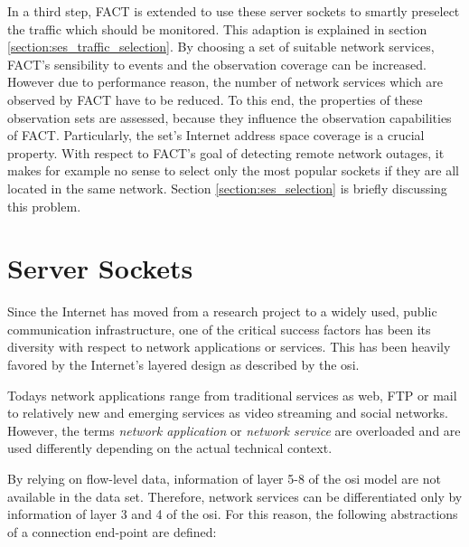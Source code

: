 In a third step, FACT is extended to use these server sockets to smartly preselect the traffic which should be monitored. 
This adaption is explained in section \ref{section:ses_traffic_selection}. 
By choosing a set of suitable network services, \gls{FACT}'s sensibility to events and the observation coverage can be increased. 
However due to performance reason, the number of network services which are observed by \gls{FACT} have to be reduced. 
To this end, the properties of these observation sets are assessed, because they influence the observation capabilities of \gls{FACT}. 
Particularly, the set's Internet address space coverage is a crucial property. 
With respect to FACT's goal of detecting remote network outages, it makes for example no sense to select only the most popular sockets if they are all located in the same network. 
Section \ref{section:ses_selection} is briefly discussing this problem.

\section{Server Sockets}
Since the Internet has moved from a research project to a widely used, public communication infrastructure, one of the critical success factors has been its diversity with respect to network applications or services. This has been heavily favored by the Internet's layered design as described by the \gls{osi}.

Todays network applications range from traditional services as web, \gls{FTP} or mail to relatively new and emerging services as video streaming and social networks. However, the terms \emph{network application} or \emph{network service} are overloaded and are used differently depending on the actual technical context.

By relying on flow-level data, information of layer 5-8 of the \gls{osi} model are not available in the data set. Therefore, network services can be differentiated only by information of layer 3 and 4 of the \gls{osi}. For this reason, the following abstractions of a connection end-point are defined:

